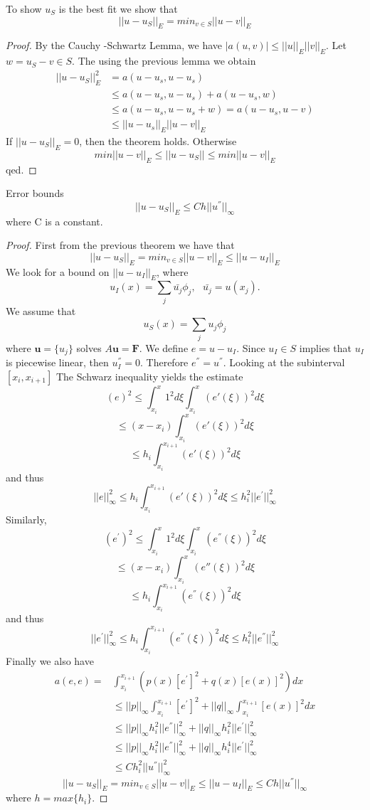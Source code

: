 \begin{theorem}
To show $u_{S}$ is the best fit we show that
\[||u-u_S||_E = min_{v\in S}||u-v||_E \]
\end{theorem}
\begin{proof}
By the Cauchy -Schwartz Lemma, we have $|a(u,v)|\leq ||u||_E||v||_E$.
Let $w=u_S-v \in S$. The using the previous lemma we obtain
\[\begin{array}{ll}
||u-u_S||^2_E & = a(u-u_s,u-u_s)\\
& \leq a(u-u_s,u-u_s)+a(u-u_s,w)\\
& \leq a(u-u_s,u-u_s+w)=a(u-u_s,u-v)\\
& \leq ||u-u_s||_{E}||u-v||_E
\end{array} \]
If $||u-u_S ||_E=0$, then the theorem holds. Otherwise
\[min ||u-v||_E\leq ||u-u_S|| \leq min||u-v||_E \]
qed.
\end{proof}
\begin{theorem}
Error bounds
\[||u-u_S||_E \leq C h||u^{''}||_\infty\]
where C is a constant.
\end{theorem}
\begin{proof}
First from the previous theorem we have that
\[||u-u_S||_E = min_{v\in S}||u-v||_E \leq ||u-u_I||_E\]
We look for a bound on $||u-u_I||_E$, where 
\[u_{I}(x) = \sum_j \bar{u_j} \phi_j, \ \ \ \bar{u_j}=u(x_j). \]
We assume that 
\[u_{S}(x) = \sum_j u_j \phi_j\] 
where $\mathbf{u}=\{u_j\}$ solves $A\mathbf{u}=\mathbf{F}$.
We define $e=u-u_I$. Since $u_I\in S$ implies that $u_I$ is piecewise
linear, then $u^{''}_I=0$. Therefore $e^{''}=u^{''}$.
Looking at the subinterval $[x_i,x_{i+1}]$
The Schwarz inequality yields the estimate
\[(e)^2 \leq \int_{x_i}^x 1^2 d \xi \int_{x_i}^{x}(e'(\xi))^2d \xi \]
\[ \leq (x-x_i) \int_{x_i}^{x}(e'(\xi))^2d \xi \]
\[ \leq h_i \int_{x_i}^{x_{i+1}}(e'(\xi))^2d \xi \]
and thus 
\[||e||^2_{\infty} \leq  h_i \int_{x_i}^{x_{i+1}}(e'(\xi))^2d \xi\leq h_i^2 ||e^{'}||^2_{\infty} \]
Similarly,
\[(e^{'})^2 \leq \int_{x_i}^x 1^2 d \xi \int_{x_i}^{x}(e^{''}(\xi))^2d \xi \]
\[ \leq (x-x_i) \int_{x_i}^{x}(e{''}(\xi))^2d \xi \]
\[ \leq h_i \int_{x_i}^{x_{i+1}}(e^{''}(\xi))^2d \xi \]
and thus 
\[||e^{'}||^2_{\infty} \leq  h_i \int_{x_i}^{x_{i+1}}(e^{''}(\xi))^2d \xi\leq h_i^2 ||e^{''}||^2_{\infty} \]
Finally we also have
\[
\begin{array}{ll}
a(e,e) =& \int_{x_i}^{x_{i+1}} (p(x)[e^{'}]^2 +q(x)[e(x)]^2)dx \\
& \leq ||p||_{\infty}\int_{x_i}^{x_{i+1}} [e^{'}]^2 +||q||_{\infty}\int_{x_i}^{x_{i+1}} [e(x)]^2dx \\
& \leq ||p||_{\infty}h_i^2 ||e^{''}||^2_{\infty}+||q||_{\infty}h_i^2 ||e^{'}||^2_{\infty} \\
& \leq ||p||_{\infty}h_i^2 ||e^{''}||^2_{\infty}+||q||_{\infty}h_i^4 ||e^{'}||^2_{\infty} \\
& \leq C h_i^2 ||u^{''}||^2_{\infty}
\end{array}
\]
\[||u-u_S||_E = min_{v\in S}||u-v||_E \leq ||u-u_I||_E \leq C h ||u^{''}||_{\infty}
 \]
where $h=max\{h_{i}\}$.
\end{proof}


